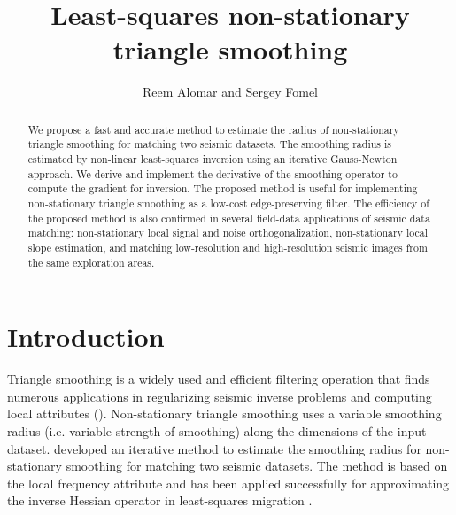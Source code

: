 \title{Least-squares non-stationary triangle smoothing}

\author{Reem Alomar and Sergey Fomel}


\maketitle

\begin{abstract}
  We propose a fast and accurate method to estimate the radius of non-stationary triangle smoothing for matching two seismic datasets. The smoothing radius is estimated by non-linear least-squares inversion using an iterative Gauss-Newton approach. We derive and implement the derivative of the smoothing operator to compute the gradient for inversion. 
  The proposed method is useful for implementing non-stationary triangle smoothing as a low-cost edge-preserving filter. 
  The efficiency of the proposed method is also confirmed in several field-data applications of seismic data matching: non-stationary local signal and noise orthogonalization, non-stationary local slope estimation, and matching low-resolution and high-resolution seismic images from the same exploration areas.
\end{abstract}

\section{Introduction}
Triangle smoothing is a widely used and efficient filtering operation that finds numerous applications in regularizing seismic inverse problems and computing local attributes (\citealp{fomel2007a,fomel2007b}). Non-stationary triangle smoothing uses a variable smoothing radius (i.e. variable strength of smoothing) along the dimensions of the input dataset. \cite{greerfomel2018} developed an iterative method to estimate the smoothing radius for non-stationary smoothing for matching two seismic datasets. The method is based on the local frequency attribute and has been applied successfully for approximating the inverse Hessian operator in least-squares migration \cite[]{greer2018}. 

